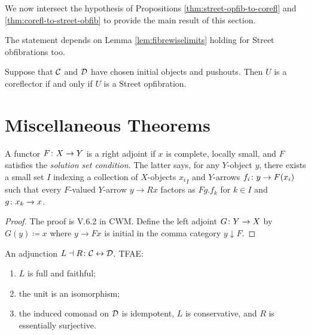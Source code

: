 \documentclass{amsart}
\begin{document}
We now intersect the hypothesis of Propositions
\ref{thm:street-opfib-to-corefl} and
\ref{thm:corefl-to-street-obfib} to provide the
main result of this section.

{\daniel The statement depends on Lemma
  \ref{lem:fibrewiselimits} holding for Street
  obfibrations too.}

\begin{thm}
  \label{thm:main-theorem-street-version}
  Suppose that $ \mathcal{C} $ and $ \mathcal{D} $ have chosen
  initial objects and pushouts. Then $ U $ is a
  coreflector if and only if $ U $ is a Street
  opfibration.  
\end{thm}



\section{Miscellaneous Theorems}

\begin{thm}
\label{thm:GAFT}
	A functor $ F \colon X \to Y $ is a right adjoint if  $ x $ is complete, locally small, and $ F $ satisfies the \emph{solution set condition}. The latter says, for any $ Y $-object $ y $, there exists a small set $ I $ indexing a collection of $ X $-objects $ {x_i}_I $ and $ Y $-arrows $ {f_i \colon y \to F ( x_i ) } $ such that every $ F $-valued $ Y $-arrow $ y \to R x $ factors as $ Fg . f_k $ for $ k \in I $ and $ g \colon x_k \to x $.
\end{thm}

\begin{proof}
	The proof is V.6.2 in CWM.  Define the left adjoint $ G \colon Y \to X $ by $ G (y) \coloneqq x $ where $ y \to F x $ is initial in the comma category $ y \downarrow F $.  
\end{proof}

\begin{thm}
\label{thm:GabZis}
	An adjunction $ L \dashv R \colon \mathcal{C} \leftrightarrow \mathcal{D} $. TFAE:
	\begin{enumerate}
		\item $ L $ is full and faithful;
		\item the unit is an isomorphism;
		\item the induced comonad on $ \mathcal{D} $ is idempotent, $ L $ is conservative, and $ R $ is essentially surjective.
	\end{enumerate}
\end{thm}
\end{document}
